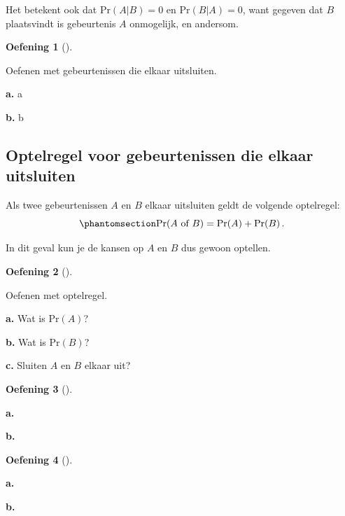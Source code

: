 \documentclass[
  a4paper,
]{scrbook}
\theoremstyle{definition}
\newtheorem{exercise}{Oefening}[chapter]
\theoremstyle{definition}
\theoremstyle{remark}
\begin{document}
Het betekent ook dat \(\textrm{Pr}\!\left(A | B\right) = 0\) en
\(\textrm{Pr}\!\left(B | A\right) = 0\), want gegeven dat \(B\)
plaatsvindt is gebeurtenis \(A\) onmogelijk, en andersom.

\begin{exercise}[]\protect\hypertarget{exr-uitsluiten}{}\label{exr-uitsluiten}

Oefenen met gebeurtenissen die elkaar uitsluiten.

\textbf{a.} a

\textbf{b.} b

\end{exercise}

\subsection{Optelregel voor gebeurtenissen die elkaar
uitsluiten}\label{optelregel-voor-gebeurtenissen-die-elkaar-uitsluiten}

Als twee gebeurtenissen \(A\) en \(B\) elkaar uitsluiten geldt de
volgende optelregel:
\begin{equation}\phantomsection\label{eq-AofBspeciaal}{
\textrm{Pr}\!\left(A \textrm{ of } B\right)  = \textrm{Pr}\!\left(A\right) + \textrm{Pr}\!\left(B\right).
}\end{equation}

In dit geval kun je de kansen op \(A\) en \(B\) dus gewoon optellen.

\begin{exercise}[]\protect\hypertarget{exr-optelregel-1}{}\label{exr-optelregel-1}

Oefenen met optelregel.

\textbf{a.} Wat is \(\textrm{Pr}\!\left(A\right)\)?

\textbf{b.} Wat is \(\textrm{Pr}\!\left(B\right)\)?

\textbf{c.} Sluiten \(A\) en \(B\) elkaar uit?

\end{exercise}

\begin{exercise}[]\protect\hypertarget{exr-optelregel-2}{}\label{exr-optelregel-2}

\textbf{a.}

\textbf{b.}

\end{exercise}

\begin{exercise}[]\protect\hypertarget{exr-optelregel-3}{}\label{exr-optelregel-3}

\textbf{a.}

\textbf{b.}

\end{exercise}
\end{document}
